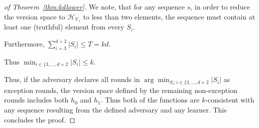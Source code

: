 \documentclass[anon]{alt2027} %
\begin{document}
\begin{proof}[of Theorem~\ref{thm:kdlower}]
We note, that for any sequence $s$, in order to reduce the version space to $\mathcal{H}_{\mathcal{V}_s}$ to less than two elements, the sequence must contain at least one (truthful) element from every $S_i$.

Furthermore, $\sum_{i=3}^{d+2} |S_i| \leq T = k d$.

Thus $\min_{i \in \{3, \dots, d+2}|S_i| \leq k$.

Thus, if the adversary declares all rounds in $ \arg\min_{S_i: i \in \{3, \dots, d+2}|S_i| $ as exception rounds, the version space defined by the remaining non-exception rounds includes both $h_0$ and $h_1$.
Thus both of the functions are $k$-consistent with any sequence resulting from the defined adversary and any learner. This concludes the proof.



 
\end{proof}



\fi
\end{document}
